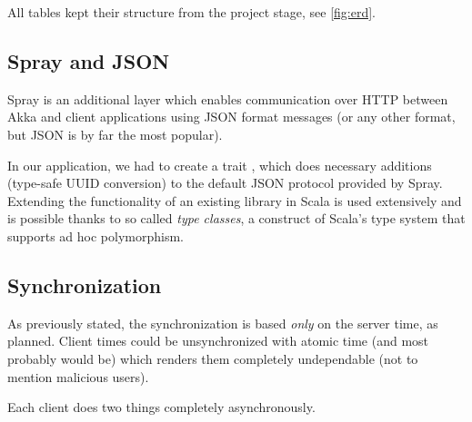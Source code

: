 All tables kept their structure from the project stage, see \cref{fig:erd}.

\subsection{Spray and JSON}
\label{subsection:akka-spray}
Spray is an additional layer which enables communication over HTTP between Akka and client applications using JSON format messages (or any other format, but JSON is by far the most popular).

In our application, we had to create a trait , which does necessary additions (type-safe UUID conversion) to the default JSON protocol provided by Spray. Extending the functionality of an existing library in Scala is used extensively and is possible thanks to so called \emph{type classes}, a construct of Scala's type system that supports ad hoc polymorphism.

\subsection{Synchronization}
\label{subsection:akka-synchro}
As previously stated, the synchronization is based \emph{only} on the server time, as planned. Client times could be unsynchronized with atomic time (and most probably would be) which renders them completely undependable (not to mention malicious users).

Each client does two things completely asynchronously.

